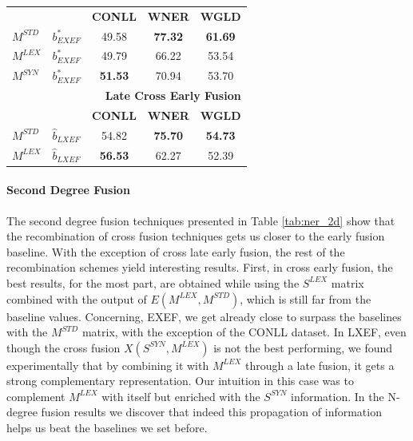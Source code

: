 \documentclass{llncs}
\newcommand\mlex{M^{\scriptscriptstyle LEX}}
\newcommand\mstd{M^{\scriptscriptstyle STD}}
\newcommand\slex{S^{\scriptscriptstyle LEX}}
\newcommand\ssyn{S^{\scriptscriptstyle SYN}}
\begin{document}
\begin{table}[!tb]
\begin{minipage}[t]{0.48\textwidth}
\begin{tabular}{@{}llccc@{}}
	                         &                & \textbf{CONLL} & \textbf{WNER}  &             \textbf{WGLD}             \\
	\cmidrule{3-5}
$M^{\scriptscriptstyle STD}$ & $b^*_{\scriptscriptstyle EXEF}$          & 49.58 & \textbf{77.32} &            \textbf{61.69}             \\
	$M^{\scriptscriptstyle LEX}$                & $b^*_{\scriptscriptstyle EXEF}$      & 49.79 & 66.22 &            53.54             \\
	$M^{\scriptscriptstyle SYN}$                & $b^*_{\scriptscriptstyle EXEF}$           & \textbf{51.53} & 70.94 &            53.70             \\ \midrule
	                         &                & \multicolumn{3}{r}{\textbf{Late Cross Early Fusion}}  \\ \midrule
	                         &                & \textbf{CONLL} & \textbf{WNER}  &             \textbf{WGLD}             \\
	\cmidrule{3-5}
$M^{\scriptscriptstyle STD}$ &$\hat{b}_{\scriptscriptstyle LXEF}$           &  54.82   & \textbf{75.70} &            \textbf{54.73}             \\
	$M^{\scriptscriptstyle LEX}$                & $\hat{b}_{\scriptscriptstyle LXEF}$  & \textbf{56.53} & 62.27 &            52.39             \\ \bottomrule
\end{tabular}
\end{minipage}
\end{table}

\paragraph{Second Degree Fusion} 
The second degree fusion techniques presented in Table \ref{tab:ner_2d} show that the recombination of cross fusion techniques gets us closer to the early fusion baseline. With the exception of cross late early fusion, the rest of the recombination schemes yield interesting results. First, in cross early fusion, the best results, for the most part, are obtained while using the $\slex$ matrix combined with the output of $E(\mlex, \mstd)$, which is still far from the baseline values. Concerning, EXEF, we get already close to surpass the baselines with the $\mstd$ matrix, with the exception of the CONLL dataset. In LXEF, even though the cross fusion $X(\ssyn, \mlex)$ is not the best performing, we found experimentally that by combining it with $\mlex$ through a late fusion, it gets  a strong complementary representation. Our intuition in this case was to complement $\mlex$ with itself but enriched with the $\ssyn$ information. In the N-degree fusion results we discover that indeed this propagation of information helps us beat the baselines we set before.
\end{document}
